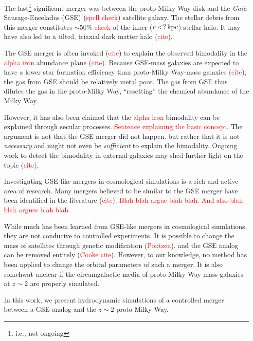 The last\footnote{i.e., not ongoing} significant merger was between the
proto-Milky Way disk and the {\em Gaia}-Sausage-Enceladus (GSE)
(\textcolor{red}{spell check}) satellite galaxy. The stellar debris from this
merger constitutes $\sim50\%$ \textcolor{red}{check} of the inner ($r<?\,\textrm{kpc}$)
stellar halo. It may have also led to a tilted, triaxial dark matter halo
(\textcolor{red}{cite}).

The GSE merger is often invoked (\textcolor{red}{cite}) to explain the observed
bimodality in the \textcolor{red}{alpha iron} abundance plane
(\textcolor{red}{cite}). Because GSE-mass galaxies are expected to have a lower
star formation efficiency than proto-Milky Way-mass galaxies
(\textcolor{red}{cite}), the gas from GSE should be relatively metal poor. The
gas from GSE thus dilutes the gas in the proto-Milky Way, ``resetting'' the
chemical abundance of the Milky Way.

However, it has also been claimed that the \textcolor{red}{alpha iron}
bimodality can be explained through secular processes. \textcolor{red}{Sentence
explaining the basic concept.} The argument is not that the GSE merger did not
happen, but rather that it is not {\it necessary} and might not even be {\it
sufficient} to explain the bimodality. Ongoing work to detect the bimodality in
external galaxies may shed further light on the topic (\textcolor{red}{cite}).

Investigating GSE-like mergers in cosmological simulations is a rich and active
area of research. Many mergers believed to be similar to the GSE merger have
been identified in the literature (\textcolor{red}{cite}). \textcolor{red}{Blah
blah argue blah blah. And also blah blah argues blah blah.}

While much has been learned from GSE-like mergers in cosmological simulations,
they are not conducive to controlled experiments. It is possible to change the
mass of satellites through genetic modification (\textcolor{red}{Pontzen}), and
the GSE analog can be removed entirely (\textcolor{red}{Cooke cite}). However,
to our knowledge, no method has been applied to change the orbital parameters of
such a merger. It is also somehwat unclear if the circumgalactic media of
proto-Milky Way mass galaxies at $z\sim2$ are properly simulated.

In this work, we present hydrodynamic simulations of a controlled merger between
a GSE analog and the $z\sim2$ proto-Milky Way. 

